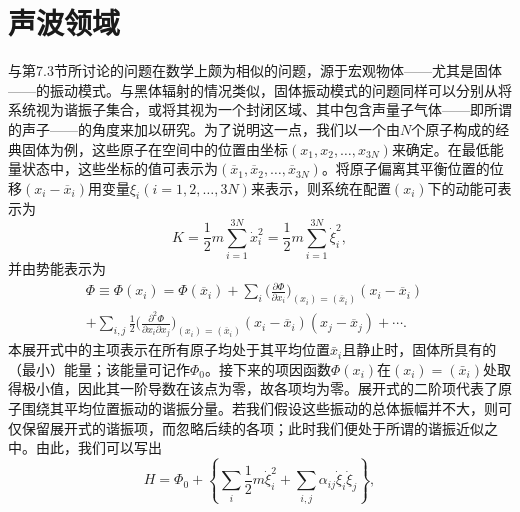 \section{声波领域}\label{ux58f0ux6ce2ux9886ux57df}
与第7.3节所讨论的问题在数学上颇为相似的问题，源于宏观物体——尤其是固体——的振动模式。与黑体辐射的情况类似，固体振动模式的问题同样可以分别从将系统视为谐振子集合，或将其视为一个封闭区域、其中包含声量子气体——即所谓的声子——的角度来加以研究。为了说明这一点，我们以一个由\(N\)个原子构成的经典固体为例，这些原子在空间中的位置由坐标\((x_1, x_2, \ldots, x_{3N})\)来确定。在最低能量状态中，这些坐标的值可表示为\((\overline{x}_1, \overline{x}_2, \ldots, \overline{x}_{3N})\)。将原子偏离其平衡位置的位移\((x_i - \overline{x}_i)\)用变量\(\xi_i (i = 1, 2, \ldots, 3N)\)来表示，则系统在配置\((x_i)\)下的动能可表示为
\begin{equation}\tag{7.4.1}\label{eq:7.4.1}
K = \frac { 1 } { 2 } m \sum _ { i = 1 } ^{3 N} \dot { x } _ { i } ^{2} = \frac { 1 } { 2 } m \sum _ { i = 1 } ^{3 N} \dot { \xi } _ { i } ^{2} ,
\end{equation}
并由势能表示为
\begin{equation}\tag{7.4.2}\label{eq:7.4.2}
\begin{array}{rl} { \Phi \equiv \Phi ( x _ { i } ) = \Phi ( \overline { { x } } _ { i } ) + \sum _ { i } \bigg ( \frac { \partial \Phi } { \partial x _ { i } } \bigg ) _ { ( x _ { i } ) = ( \overline { { x } } _ { i } ) } ( x _ { i } - \overline { { x } } _ { i } ) } & { } \\{ + \sum _ { i , j } \frac { 1 } { 2 } \bigg ( \frac { \partial ^{2} \Phi } { \partial x _ { i } \partial x _ { j } } \bigg ) _ { ( x _ { i } ) = ( \overline { { x } } _ { i } ) } ( x _ { i } - \overline { { x } } _ { i } ) ( x _ { j } - \overline { { x } } _ { j } ) + \cdots . } & { } \end{array}
\end{equation}
本展开式中的主项表示在所有原子均处于其平均位置\(\bar{x}_{i}\)且静止时，固体所具有的（最小）能量；该能量可记作\(\Phi_{0}\)。接下来的项因函数\(\Phi(x_{i})\)在\((x_{i})=(\bar{x}_{i})\)处取得极小值，因此其一阶导数在该点为零，故各项均为零。展开式的二阶项代表了原子围绕其平均位置振动的谐振分量。若我们假设这些振动的总体振幅并不大，则可仅保留展开式的谐振项，而忽略后续的各项；此时我们便处于所谓的谐振近似之中。由此，我们可以写出
\begin{equation}\tag{7.4.3}\label{eq:7.4.3}
H = \Phi _ { 0 } + \left\{ \sum _ { i } \frac { 1 } { 2 } m \dot { \xi } _ { i } ^{2} + \sum _ { i , j } \alpha _ { i j } \dot { \xi } _ { i } \dot { \xi } _ { j } \right\} ,
\end{equation}
